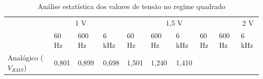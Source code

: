 \documentclass[14pt, oneside]{book}
\theoremstyle{definition}
\begin{document}
                \begin{table}[H]
                    \centering
                    {\renewcommand\arraystretch{1.25}
                    \caption{Análise estatística dos valores de tensão no regime quadrado}
                    \begin{tabular}{ l l l l l l l l l l }
                        \cline{1-1}\cline{2-2}\cline{3-3}\cline{4-4}\cline{5-5}\cline{6-6}\cline{7-7}\cline{8-8}\cline{9-9}\cline{10-10}  
                            \multicolumn{1}{|p{3.033cm}|}{{  \centering }} &
                            \multicolumn{3}{p{3.883cm}|}{\centering \ \ \ \ \ \ 1 V  } &
                            \multicolumn{3}{p{3.117cm}|}{\ \ \ \ \ \ \ \ \ \ \ 1,5  V \centering } &
                            \multicolumn{3}{p{2.733cm}|}{\ \ \ \ \ \ \ \ \ \ \ \ 2 V \centering }
                      \\  
                        \cline{2-2}\cline{3-3}\cline{4-4}\cline{5-5}\cline{6-6}\cline{7-7}\cline{8-8}\cline{9-9}\cline{10-10}  
                            \multicolumn{1}{|p{1.0cm}|}{} &
                            \multicolumn{1}{p{1.367cm}|}{60 Hz \centering } &
                            \multicolumn{1}{p{1.333cm}|}{600 Hz \centering } &
                            \multicolumn{1}{p{1.000cm}|}{6 kHz \centering } &
                            \multicolumn{1}{p{1.350cm}|}{60 Hz \centering } &
                            \multicolumn{1}{p{1.050cm}|}{600 Hz \centering } &
                            \multicolumn{1}{p{0.983cm}|}{6 kHz \centering } &
                            \multicolumn{1}{p{1.350cm}|}{60 Hz \centering } &
                            \multicolumn{1}{p{1.050cm}|}{600 Hz \centering } &
                            \multicolumn{1}{p{0.933cm}|}{6 kHz \centering }
                      \\  
                        \cline{1-1}\cline{2-2}\cline{3-3}\cline{4-4}\cline{5-5}\cline{6-6}\cline{7-7}\cline{8-8}\cline{9-9}\cline{10-10}  
                            \multicolumn{1}{|p{3.033cm}|}{Analógico ($V_{RMS}$) \centering } &
                            \multicolumn{1}{p{1.367cm}|}{0,801 \centering } &
                            \multicolumn{1}{p{1.333cm}|}{0,899 \centering } &
                            \multicolumn{1}{p{1.000cm}|}{0,698 \centering } &
                            \multicolumn{1}{p{1.350cm}|}{1,501 \centering } &
                            \multicolumn{1}{p{1.050cm}|}{1,240 \centering } &
                            \multicolumn{1}{p{0.983cm}|}{1,410 \centering } &

\end{tabular}}
\end{table}
\end{document}
